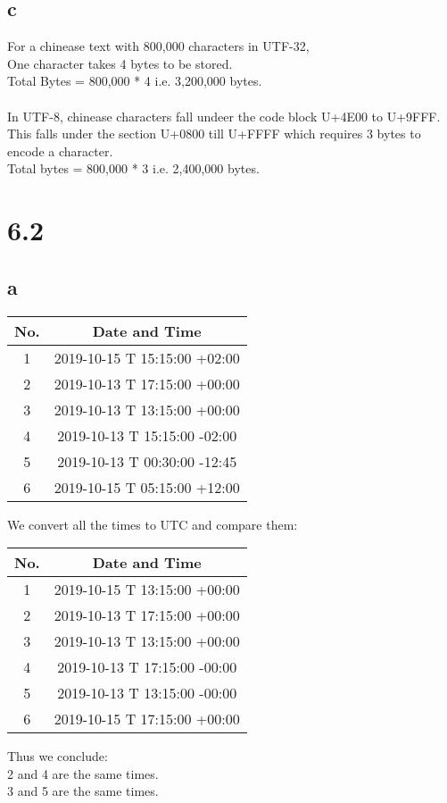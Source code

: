 \documentclass{article}
\begin{document}
    \subsection{c}
    For a chinease text with 800,000 characters in UTF-32,\\
    One character takes 4 bytes to be stored.\\
    Total Bytes = 800,000 * 4 i.e. 3,200,000 bytes.\\
    \\
    In UTF-8, chinease characters fall undeer the code block U+4E00 to U+9FFF.\\
    This falls under the section U+0800 till U+FFFF which requires 3 bytes to encode
    a character.\\
    Total bytes = 800,000 * 3 i.e. 2,400,000 bytes.\\

    \section{6.2}
    \subsection{a}
    \begin{center}
        \begin{tabular}{c c}
            \hline
            No. & Date and Time\\
            \hline
            1 & 2019-10-15 T 15:15:00 +02:00\\
            2 & 2019-10-13 T 17:15:00 +00:00\\
            3 & 2019-10-13 T 13:15:00 +00:00\\
            4 & 2019-10-13 T 15:15:00 -02:00\\
            5 & 2019-10-13 T 00:30:00 -12:45\\
            6 & 2019-10-15 T 05:15:00 +12:00\\
            \hline
        \end{tabular}
    \end{center}
    We convert all the times to UTC and compare them:\\
    \begin{center}
        \begin{tabular}{c c}
            \hline
            No. & Date and Time\\
            \hline
            1 & 2019-10-15 T 13:15:00 +00:00\\
            2 & 2019-10-13 T 17:15:00 +00:00\\
            3 & 2019-10-13 T 13:15:00 +00:00\\
            4 & 2019-10-13 T 17:15:00 -00:00\\
            5 & 2019-10-13 T 13:15:00 -00:00\\
            6 & 2019-10-15 T 17:15:00 +00:00\\
            \hline
        \end{tabular}
    \end{center}
    Thus we conclude:\\
    2 and 4 are the same times.\\
    3 and 5 are the same times.\\
\end{document}
